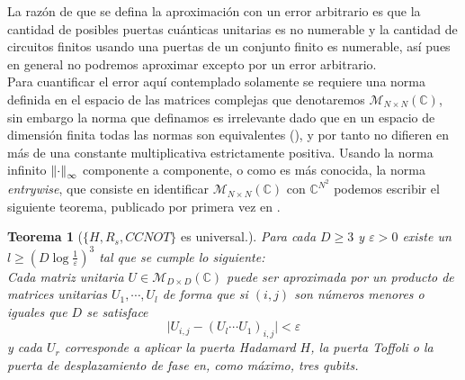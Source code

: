 \documentclass[11pt, spanish]{report}
\numberwithin{equation}{section}
\newtheorem{teo}[defin]{Teorema}
\numberwithin{defin}{section}
\newenvironment{purpleBox}{\begin{tcolorbox}[colback=purple!3!white,colframe=purple!75!black]}{\end{tcolorbox}}
\begin{document}
\begin{appendices}
La razón de que se defina la aproximación con un error arbitrario es que la cantidad de posibles puertas cuánticas unitarias es no numerable y la cantidad de circuitos finitos usando una puertas de un conjunto finito es numerable, así pues en general no podremos aproximar excepto por un error arbitrario\footnotemark{}.	\\

Para cuantificar el error aquí contemplado solamente se requiere una norma definida en el espacio de las matrices complejas que denotaremos $\mathcal{M}_{N\times N}(\mathbb{C})$, sin embargo la norma que definamos es irrelevante dado que en un espacio de dimensión finita todas las normas son equivalentes (\cite{kreyszig1978introductory}), y por tanto no difieren en más de una constante multiplicativa estrictamente positiva. Usando la norma infinito $\norm{\cdot}_\infty $ componente a componente, o como es más conocida, la norma \emph{entrywise}, que consiste en identificar $\mathcal{M}_{N\times N}(\mathbb{C})$ con $\mathbb{C}^{N^2}$  podemos escribir el siguiente teorema, publicado por primera vez en \cite{deutsch1989quantum}. \\


\begin{purpleBox}
\begin{teo}[$\{H, R_s, CCNOT\}$ es universal.]\label{teoUniv}
Para cada $D\geq 3$ y $\varepsilon > 0$ existe un $l\geq (D\log \frac{1}{\varepsilon})^3$ tal que se cumple lo siguiente:\\

Cada matriz unitaria $U\in\mathcal{M}_{D\times D}(\mathbb{C})$ puede ser aproximada por un producto de matrices unitarias $U_1,\cdots,U_l$ de forma que si $(i,j)$ son números menores o iguales que $D$ se satisface
\begin{equation}
\Big| U_{i,j}-(U_l\cdots U_1)_{i,j} \Big| < \varepsilon
\end{equation} 
y cada $U_r$ corresponde a aplicar la puerta Hadamard $H$, la puerta Toffoli o la puerta de desplazamiento de fase en, como máximo, tres qubits.
\end{teo}
\end{purpleBox}


\end{appendices}
\end{document}
